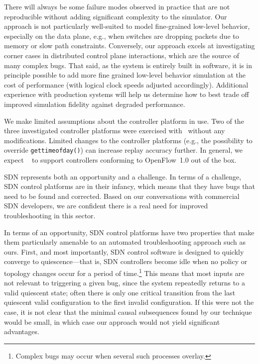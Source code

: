  There will always be some failure modes observed in practice that are
not reproducible without adding significant complexity to the simulator. Our
approach is not particularly well-suited to model fine-grained low-level
behavior, especially on the data plane, e.g., when switches are dropping
packets due to memory or slow path constraints. Conversely, our approach excels at
investigating corner cases in distributed control plane interactions, which
are the source of many complex bugs. That said, as the system is entirely
built in software, it is in principle possible to add more fine grained
low-level behavior simulation at the cost of performance (with logical clock
speeds adjusted accordingly).  Additional experience with production systems will help
us determine how to best trade off improved simulation fidelity against degraded performance.

 We make limited
assumptions about the controller platform in use. Two of the three investigated
controller platforms were exercised with \simulator~without any modifications.
Limited changes to the controller platforms (e.g., the possibility to override
{\tt gettimeofday()}) can increase replay accuracy further.
In general, we expect \simulator~ to support controllers conforming to
OpenFlow~1.0 out of the box.

 SDN represents both an
opportunity and a challenge. In terms of a challenge, SDN control platforms are
in their infancy, which means that they have bugs that need to be found and
corrected. Based on our conversations with commercial SDN developers, we are
confident there is a real need for improved troubleshooting in this sector.

In terms of an opportunity, SDN control platforms have two properties that make
them particularly amenable to an automated troubleshooting approach such as
ours. First, and most importantly, SDN control software is designed to quickly
converge to quiescence---that is, SDN controllers become idle when no policy or
topology changes occur for a period of time.\footnote{Complex bugs may occur when
several such processes overlay.} This means that most inputs are not relevant
to triggering a given bug, since the system repeatedly returns to a valid
quiescent state; often there is only one critical transition from the last
quiescent valid configuration to the first invalid configuration. If this were
not the case, it is not clear that the minimal causal subsequences found by our
technique would be small, in which case our approach would not yield significant
advantages.

